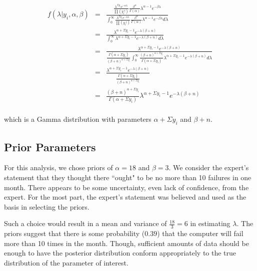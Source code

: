 \documentclass[12pt]{article}
\begin{document}
\begin{eqnarray*}
f(\lambda|y_i,\alpha,\beta) &=& \frac{\frac{\lambda^{\Sigma y_i}e^{-n\lambda}}{\prod (y_i!)}\frac{\beta^\alpha}{\Gamma(\alpha)}\lambda^{\alpha-1}e^{-\beta\lambda}}{\int_0^\infty\frac{\lambda^{\Sigma y_i}e^{-n\lambda}}{\prod (y_i!)}\frac{\beta^\alpha}{\Gamma(\alpha)}\lambda^{\alpha-1}e^{-\beta\lambda}d\lambda} \\
&=& \frac{\lambda^{\alpha+\Sigma y_i-1}e^{-\lambda(\beta+n)}}{\int_0^\infty\lambda^{\alpha+\Sigma y_i-1}e^{-\lambda(\beta+n)}d\lambda} \\
&=& \frac{\lambda^{\alpha+\Sigma y_i-1}e^{-\lambda(\beta+n)}}{\frac{\Gamma(\alpha+\Sigma y_i)}{(\beta+n)^{\alpha+\Sigma y_i}}\int_0^\infty\frac{(\beta+n)^{\alpha+\Sigma y_i}}{\Gamma(\alpha+\Sigma y_i)}\lambda^{\alpha+\Sigma y_i-1}e^{-\lambda(\beta+n)}d\lambda} \\
&=& \frac{\lambda^{\alpha+\Sigma y_i-1}e^{-\lambda(\beta+n)}}{\frac{\Gamma(\alpha+\Sigma y_i)}{(\beta+n)^{\alpha+\Sigma y_i}}} \\
&=& \frac{(\beta+n)^{\alpha+\Sigma y_i}}{\Gamma(\alpha+\Sigma y_i)}\lambda^{\alpha+\Sigma y_i-1}e^{-\lambda(\beta+n)} \\
\end{eqnarray*}

\noindent which is a Gamma distribution with parameters $\alpha+\Sigma y_i$ and $\beta+n$.  %

\subsection{Prior Parameters}

\noindent For this analysis, we chose priors of $\alpha=18$ and $\beta=3$.  We consider the expert's statement that they thought there ``ought" to be no more than 10 failures in one month.  There appears to be some uncertainty, even lack of confidence, from the expert.  For the most part, the expert's statement was believed and used as the basis in selecting the priors.
\bigskip

\noindent Such a choice would result in a mean and variance of $\frac{18}{3}=6$ in estimating $\lambda$.  The priors suggest that there is some probability ($0.39$) that the computer will fail more than 10 times in the month.  Though, sufficient amounts of data should be enough to have the posterior distribution conform appropriately to the true distribution of the parameter of interest.
\end{document}
